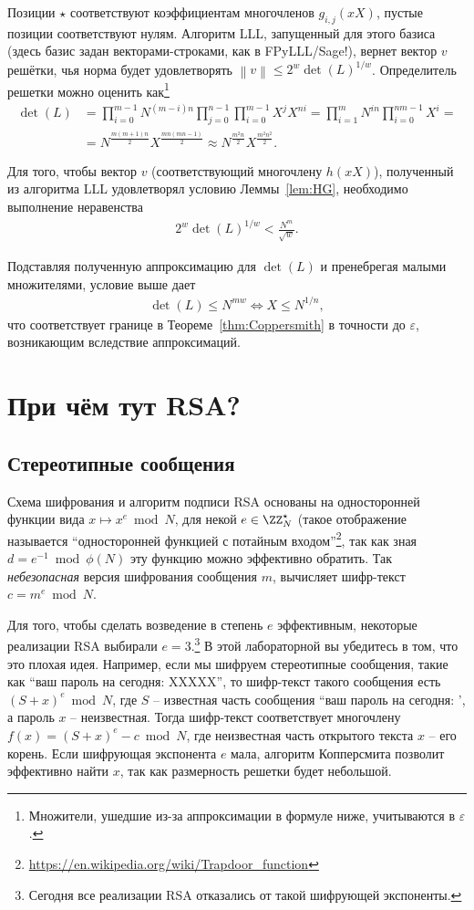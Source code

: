 \documentclass[11pt]{exam}
\theoremstyle{definition}
\newcommand*\norm[1]{\left\lVert#1\right\rVert}
\begin{document}
{	Позиции $\star$ соответствуют коэффициентам многочленов $g_{i,j}(xX)$, пустые позиции соответствуют нулям. Алгоритм LLL, запущенный для этого базиса (здесь базис задан векторами-строками, как в FPyLLL/Sage!), вернет вектор $v$ решётки, чья норма будет удовлетворять $\norm{v} \leq 2^{w} \det(L)^{1/w}$. Определитель решетки можно оценить как\footnote{Множители, ушедшие из-за аппроксимации в формуле ниже, учитываются в $\varepsilon$.}
	\begin{align*}
		\det(L) &= \prod_{i=0}^{m-1} N^{(m-i)n} \prod_{j=0}^{n-1} \prod_{i=0}^{m-1} X^j X^{ni} = \prod_{i=1}^{m} N^{in} \prod_{i=0}^{nm-1} X^i = \\
		&= N^{\frac{m(m+1)n}{2}} X^{\frac{mn(mn-1)}{2}} \approx N^{\frac{m^2n}{2}}X^{\frac{m^2n^2}{2}}.
	\end{align*}
	
	Для того, чтобы вектор $v$ (соответствующий многочлену $h(xX)$), полученный из алгоритма LLL удовлетворял условию Леммы~\ref{lem:HG}, необходимо выполнение неравенства
	\begin{align*}
		2^{w} \det(L)^{1/w} < \frac{N^m}{\sqrt{w}}.
	\end{align*}
	 
	 Подставляя полученную аппроксимацию для $\det(L)$ и пренебрегая малыми множителями, условие выше дает
	 \begin{align*}
	 	\det(L) \leq N^{mw} \iff X \leq N^{1/n},
	 \end{align*} 
	 что соответствует границе в Теореме~\ref{thm:Coppersmith} в точности до $\varepsilon$, возникающим вследствие аппроксимаций.
	
	\section{При чём тут RSA?}
	
	\subsection{Стереотипные сообщения}
	Схема шифрования и алгоритм подписи RSA основаны на односторонней функции вида $x \mapsto x^e \bmod N$, для некой $e \in \ZZ_N^\star$ (такое отображение называется ``односторонней функцией с потайным входом''\footnote{\url{https://en.wikipedia.org/wiki/Trapdoor\_function}}, так как зная $d = e^{-1} \bmod \phi(N)$ эту функцию можно эффективно обратить. Так \emph{небезопасная} версия шифрования сообщения $m$, вычисляет шифр-текст $c=m^e \bmod N$. 
	
	Для того, чтобы сделать возведение в степень $e$ эффективным, некоторые реализации RSA выбирали $e=3$.\footnote{Сегодня все реализации RSA отказались от такой шифрующей экспоненты.} В этой лабораторной вы убедитесь в том, что это плохая идея. Например, если мы шифруем стереотипные сообщения, такие как ``ваш пароль на сегодня: XXXXX'', то шифр-текст такого сообщения есть $(S+x)^e \bmod N$, где $S$ -- известная часть сообщения ``ваш пароль на сегодня: ', а пароль $x$ -- неизвестная. Тогда шифр-текст соответствует многочлену $f(x) = (S+x)^e - c \bmod N$, где неизвестная часть открытого текста $x$ -- его корень. Если шифрующая экспонента $e$ мала, алгоритм Копперсмита позволит эффективно найти $x$, так как размерность решетки будет небольшой. 
	
}
\end{document}
